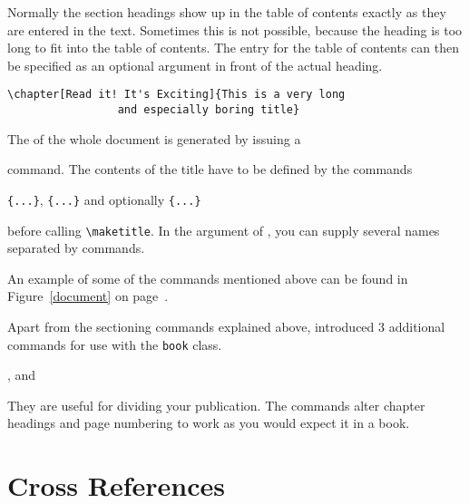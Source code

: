 Normally the section headings show up in the table of contents exactly
as they are entered in the text. Sometimes this is not possible,
because the heading is too long to fit into the table of contents. The
entry for the table of contents can then be specified as an
optional argument in front of the actual heading.
\begin{code}
\verb|\chapter[Read it! It's Exciting]{This is a very long|\\
\verb|                 and especially boring title}|
\end{code} 

The  of the whole document is generated by issuing a 
\begin{command}
\end{command}
\noindent command. The contents of the title have to be defined by the commands
\begin{command}
\verb|{...}|, \verb|{...}| 
and optionally \verb|{...}| 
\end{command}
\noindent before calling \verb|\maketitle|. In the argument of , you can
supply several names separated by  commands. 

An example of some of the commands mentioned above can be found in
Figure~\ref{document} on page~\pageref{document}.

Apart from the sectioning commands explained above, \LaTeXe{}
introduced 3 additional commands for use with the \verb|book| class. 
\begin{command}
,  and 
\end{command}
They are useful for dividing your publication. The commands alter
chapter headings and page numbering to work as you would expect it in
a book.

\section{Cross References}

